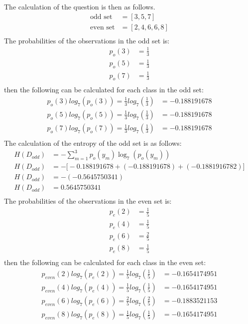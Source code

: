 \documentclass[10pt]{article}
\begin{document}
The calculation of the question is then as follows.
\begin{align*}
    \text{odd set} &= [3,5,7] \\
    \text{even set} &= [2,4,6,6,8] \\
\end{align*}
The probabilities of the observations in the odd set is:
\begin{align*}
    p_{o}(3) &= \frac{1}{3} \\
    p_{o}(5) &= \frac{1}{3} \\
    p_{o}(7) &= \frac{1}{3} \\
\end{align*}
then the following can be calculated for each class in the odd set:
\begin{align*}
    p_{o}(3) log_7 \left( p_{o}(3) \right) = \frac{1}{3} log_7 \left( \frac{1}{3} \right) &= -0.188191678\\
    p_{o}(5) log_7 \left( p_{o}(5) \right) = \frac{1}{3} log_7 \left( \frac{1}{3} \right) &= -0.188191678\\
    p_{o}(7) log_7 \left( p_{o}(7) \right) = \frac{1}{3} log_7 \left( \frac{1}{3} \right) &= -0.188191678\\
\end{align*}
The calculation of the entropy of the odd set is as follows:
\begin{align*}
    H(D_{odd}) &= - \sum_{m=1}^{3} p_{o}(y_m) \log_7 \left( p_{o}(y_m) \right) \\
    H(D_{odd}) &= - \big[ -0.188191678 + (-0.188191678) + (-0.1881916782)\big] \\
    H(D_{odd}) &= - (-0.5645750341) \\
    H(D_{odd}) &= 0.5645750341 \\
\end{align*}
The probabilities of the observations in the even set is:
\begin{align*}
    p_{e}(2) &= \frac{1}{5} \\
    p_{e}(4) &= \frac{1}{5} \\
    p_{e}(6) &= \frac{2}{5} \\
    p_{e}(8) &= \frac{1}{5} \\
\end{align*}
then the following can be calculated for each class in the even set:
\begin{align*}
    p_{even}(2) log_7 \left( p_{e}(2) \right) = \frac{1}{5} log_7 \left( \frac{1}{5} \right) &= -0.1654174951\\
    p_{even}(4) log_7 \left( p_{e}(4) \right) = \frac{1}{5} log_7 \left( \frac{1}{5} \right) &= -0.1654174951\\
    p_{even}(6) log_7 \left( p_{e}(6) \right) = \frac{2}{5} log_7 \left( \frac{2}{5} \right) &= -0.1883521153\\
    p_{even}(8) log_7 \left( p_{e}(8) \right) = \frac{1}{5} log_7 \left( \frac{1}{5} \right) &= -0.1654174951\\
\end{align*}
\end{document}
